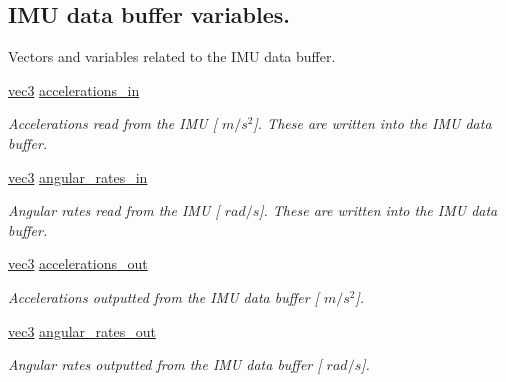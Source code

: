 \subsection*{\-I\-M\-U data buffer variables.}
\label{_amgrpc25420e6089685cb041e1744e731c61a}%
 \-Vectors and variables related to the \-I\-M\-U data buffer. \begin{DoxyCompactItemize}
\item 
\hyperlink{nav__types_8h_a90c683614d896321009d3b3c401b764f}{vec3} \hyperlink{group__nav__eq_gaf92cab44915b7d9faaf5aeadb328bae6}{accelerations\-\_\-in}
\begin{DoxyCompactList}\small\item\em \-Accelerations read from the \-I\-M\-U \mbox{[} $m/s^2$\mbox{]}. \-These are written into the \-I\-M\-U data buffer. \end{DoxyCompactList}\item 
\hyperlink{nav__types_8h_a90c683614d896321009d3b3c401b764f}{vec3} \hyperlink{group__nav__eq_ga8cac4b2812dcb492989d7122c5eb0bfb}{angular\-\_\-rates\-\_\-in}
\begin{DoxyCompactList}\small\item\em \-Angular rates read from the \-I\-M\-U \mbox{[} $rad/s$\mbox{]}. \-These are written into the \-I\-M\-U data buffer. \end{DoxyCompactList}\item 
\hyperlink{nav__types_8h_a90c683614d896321009d3b3c401b764f}{vec3} \hyperlink{group__nav__eq_ga0e1577a397995052e34d61ddbf578956}{accelerations\-\_\-out}
\begin{DoxyCompactList}\small\item\em \-Accelerations outputted from the \-I\-M\-U data buffer \mbox{[} $m/s^2$\mbox{]}. \end{DoxyCompactList}\item 
\hyperlink{nav__types_8h_a90c683614d896321009d3b3c401b764f}{vec3} \hyperlink{group__nav__eq_gabdb2113f7c6caefe1b25826c1f7c8324}{angular\-\_\-rates\-\_\-out}
\begin{DoxyCompactList}\small\item\em \-Angular rates outputted from the \-I\-M\-U data buffer \mbox{[} $rad/s$\mbox{]}. \end{DoxyCompactList}\end{DoxyCompactItemize}
